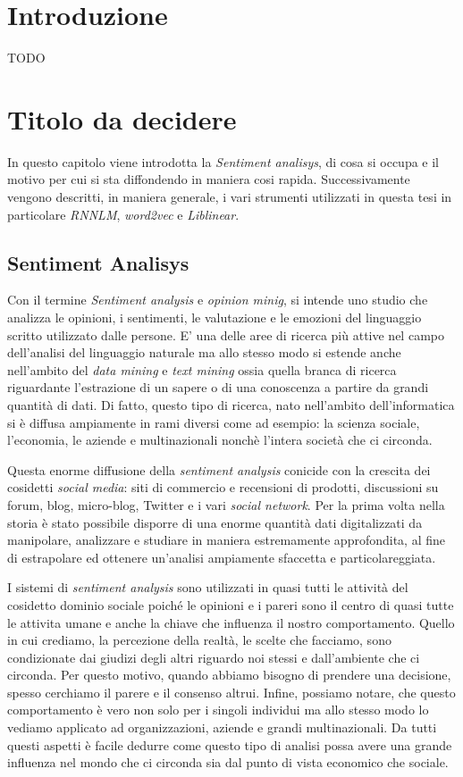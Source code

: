 \documentclass[a4paper,12pt,openright,twoside]{report}
\theoremstyle{definition}
\begin{document}
\chapter{Introduzione}
TODO

\chapter{Titolo da decidere}
In questo capitolo viene introdotta la \emph{Sentiment analisys}, di cosa si occupa e
il motivo per cui si sta diffondendo in maniera cosi rapida.
Successivamente vengono descritti, in maniera generale, i vari strumenti utilizzati
in questa tesi in particolare \emph{RNNLM}, \emph{word2vec} e \emph{Liblinear}.

\section{Sentiment Analisys}
Con il termine \emph{Sentiment analysis} e \emph{opinion minig}, si intende uno studio 
che analizza le opinioni, i sentimenti, le valutazione e le
emozioni del linguaggio scritto utilizzato dalle persone.
E' una delle aree di ricerca più attive nel campo dell'analisi del linguaggio
naturale ma allo stesso modo si estende anche nell'ambito del \emph{data mining} e
\emph{text mining} ossia quella branca di ricerca riguardante l'estrazione di un sapere o di una conoscenza a partire da grandi quantità di dati.
Di fatto, questo tipo di ricerca, nato nell'ambito dell'informatica si è diffusa
ampiamente in rami diversi come ad esempio: la scienza sociale,
l'economia, le aziende e multinazionali nonchè l'intera società che ci circonda.

Questa enorme diffusione della \emph{sentiment analysis} conicide con la 
crescita dei cosidetti \emph{social media}: siti di commercio e recensioni di prodotti,
discussioni su forum, blog, micro-blog, Twitter e i vari \emph{social network}.
Per la prima volta nella storia  è stato possibile disporre di una
enorme quantità dati digitalizzati da manipolare, analizzare e studiare in maniera
estremamente approfondita, al fine di estrapolare ed ottenere un'analisi
ampiamente sfaccetta e particolareggiata.

I sistemi di \emph{sentiment analysis} sono utilizzati in quasi tutti
le attività del cosidetto dominio sociale poiché le opinioni e i pareri sono il centro
di quasi tutte le attivita umane e anche la chiave che influenza il nostro 
comportamento.
Quello in cui crediamo, la percezione della realtà, le scelte che facciamo,
sono condizionate dai giudizi degli altri
riguardo noi stessi e dall'ambiente che ci circonda. 
Per questo motivo, quando abbiamo bisogno
di prendere una decisione, spesso cerchiamo il parere e il consenso altrui.
Infine, possiamo notare, che questo comportamento è vero non solo 
per i singoli individui ma allo stesso modo lo vediamo
applicato ad organizzazioni, aziende e grandi multinazionali.
Da tutti questi aspetti è facile dedurre 
come questo tipo di analisi possa avere una grande influenza nel mondo che 
ci circonda sia dal punto di vista economico che sociale.
\end{document}
